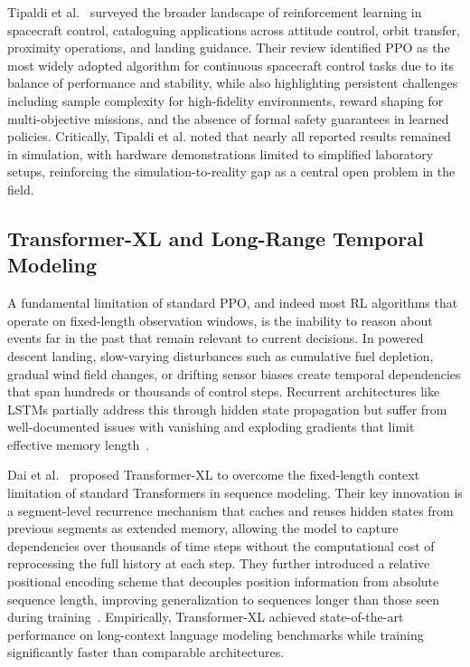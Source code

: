 \documentclass[10pt,twocolumn]{article}
\begin{document}
Tipaldi et al.~\cite{tipaldi2022} surveyed the broader landscape of reinforcement learning in spacecraft control, cataloguing applications across attitude control, orbit transfer, proximity operations, and landing guidance.
Their review identified PPO as the most widely adopted algorithm for continuous spacecraft control tasks due to its balance of performance and stability, while also highlighting persistent challenges including sample complexity for high-fidelity environments, reward shaping for multi-objective missions, and the absence of formal safety guarantees in learned policies.
Critically, Tipaldi et al. noted that nearly all reported results remained in simulation, with hardware demonstrations limited to simplified laboratory setups, reinforcing the simulation-to-reality gap as a central open problem in the field.

\subsection{Transformer-XL and Long-Range Temporal Modeling}

A fundamental limitation of standard PPO, and indeed most RL algorithms that operate on fixed-length observation windows, is the inability to reason about events far in the past that remain relevant to current decisions.
In powered descent landing, slow-varying disturbances such as cumulative fuel depletion, gradual wind field changes, or drifting sensor biases create temporal dependencies that span hundreds or thousands of control steps.
Recurrent architectures like LSTMs partially address this through hidden state propagation but suffer from well-documented issues with vanishing and exploding gradients that limit effective memory length~\cite{parisotto2020}.

Dai et al.~\cite{dai2019} proposed Transformer-XL to overcome the fixed-length context limitation of standard Transformers in sequence modeling.
Their key innovation is a segment-level recurrence mechanism that caches and reuses hidden states from previous segments as extended memory, allowing the model to capture dependencies over thousands of time steps without the computational cost of reprocessing the full history at each step.
They further introduced a relative positional encoding scheme that decouples position information from absolute sequence length, improving generalization to sequences longer than those seen during training~\cite{dai2019}.
Empirically, Transformer-XL achieved state-of-the-art performance on long-context language modeling benchmarks while training significantly faster than comparable architectures.
\end{document}
